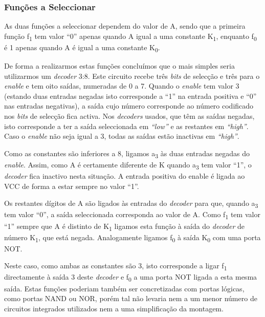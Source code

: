 \documentclass[a4paper,12pt]{article}
\begin{document}
\subsubsection{Funções a Seleccionar}
As duas funções a seleccionar dependem do valor de A, sendo que a primeira função f\textsubscript{1} tem valor ``0'' apenas quando A igual a uma constante K\textsubscript{1}, enquanto f\textsubscript{0} é 1 apenas quando A é igual a uma constante K\textsubscript{0}.
\par
De forma a realizarmos estas funções concluímos que o mais simples seria 
utilizarmos um {\it decoder} 3:8. Este circuito recebe três {\it bits} de 
selecção e três para o {\it enable} e tem oito saídas, numeradas de 0 a 7. 
Quando o {\it enable} tem valor 3 (estando duas entradas negadas isto 
corresponde a ``1'' na entrada positiva e ``0'' nas entradas negativas), a 
saída cujo número corresponde ao número codificado nos {\it bits} de 
selecção fica activa. Nos {\it decoders} usados, que têm as saídas negadas, 
isto corresponde a ter a saída seleccionada em {\it ``low''} e as restantes em 
{\it ``high''}. Caso o {\it enable} não seja igual a 3, todas as saídas 
estão inactivas em  {\it ``high''}.
\par
Como as constantes são inferiores a 8, ligamos a\textsubscript{3} às duas 
entradas negadas do {\it enable}. Assim, como A é certamente diferente de K 
quando a\textsubscript{3} tem valor ``1'', o {\it decoder} fica inactivo nesta 
situação. A entrada positiva do enable é ligada ao VCC de forma a estar 
sempre no valor ``1''. 
\par
Os restantes dígitos de A são ligados às entradas do {\it decoder} para que, 
quando a\textsubscript{3} tem valor ``0'', a saída seleccionada corresponda ao 
valor de A. Como f\textsubscript{1} tem valor ``1''  sempre que A é distinto 
de K\textsubscript{1} ligamos esta função à saída do {\it decoder} de 
número K\textsubscript{1}, que está negada. Analogamente ligamos 
f\textsubscript{0} à saída K\textsubscript{0} com uma porta NOT.
\par
Neste caso, como ambas as constantes são 3, isto corresponde a ligar 
f\textsubscript{1} directamente à saída 3 deste {\it decoder} e 
f\textsubscript{0} a uma porta NOT ligada a esta mesma saída. Estas funções 
poderiam também ser concretizadas com portas lógicas, como portas NAND ou 
NOR, porém tal não levaria nem a um menor número de circuitos integrados 
utilizados nem a uma simplificação da montagem.
\par
\end{document}
